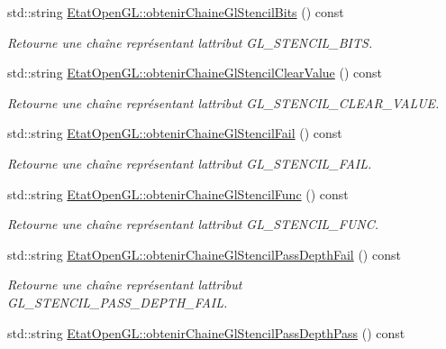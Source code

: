 \begin{DoxyCompactItemize}
std\+::string \hyperlink{group__utilitaire_ga9001f71cc6ac9cb771d5e9eeedd69c5a}{Etat\+Open\+G\+L\+::obtenir\+Chaine\+Gl\+Stencil\+Bits} () const 
\begin{DoxyCompactList}\small\item\em Retourne une chaîne représentant l\textquotesingle{}attribut G\+L\+\_\+\+S\+T\+E\+N\+C\+I\+L\+\_\+\+B\+I\+T\+S. \end{DoxyCompactList}\item 
std\+::string \hyperlink{group__utilitaire_ga0949a92c39c09a594a65cb035d992baf}{Etat\+Open\+G\+L\+::obtenir\+Chaine\+Gl\+Stencil\+Clear\+Value} () const 
\begin{DoxyCompactList}\small\item\em Retourne une chaîne représentant l\textquotesingle{}attribut G\+L\+\_\+\+S\+T\+E\+N\+C\+I\+L\+\_\+\+C\+L\+E\+A\+R\+\_\+\+V\+A\+L\+U\+E. \end{DoxyCompactList}\item 
std\+::string \hyperlink{group__utilitaire_ga3022225d3598456c739303b98e9d6ff8}{Etat\+Open\+G\+L\+::obtenir\+Chaine\+Gl\+Stencil\+Fail} () const 
\begin{DoxyCompactList}\small\item\em Retourne une chaîne représentant l\textquotesingle{}attribut G\+L\+\_\+\+S\+T\+E\+N\+C\+I\+L\+\_\+\+F\+A\+I\+L. \end{DoxyCompactList}\item 
std\+::string \hyperlink{group__utilitaire_ga1afa1d486d88c628562ec9e9ba6f6e10}{Etat\+Open\+G\+L\+::obtenir\+Chaine\+Gl\+Stencil\+Func} () const 
\begin{DoxyCompactList}\small\item\em Retourne une chaîne représentant l\textquotesingle{}attribut G\+L\+\_\+\+S\+T\+E\+N\+C\+I\+L\+\_\+\+F\+U\+N\+C. \end{DoxyCompactList}\item 
std\+::string \hyperlink{group__utilitaire_ga2e0217d78bce7c9e8aa865fa1b2d7e1f}{Etat\+Open\+G\+L\+::obtenir\+Chaine\+Gl\+Stencil\+Pass\+Depth\+Fail} () const 
\begin{DoxyCompactList}\small\item\em Retourne une chaîne représentant l\textquotesingle{}attribut G\+L\+\_\+\+S\+T\+E\+N\+C\+I\+L\+\_\+\+P\+A\+S\+S\+\_\+\+D\+E\+P\+T\+H\+\_\+\+F\+A\+I\+L. \end{DoxyCompactList}\item 
std\+::string \hyperlink{group__utilitaire_ga722cf069559981c09c4b40810b37986f}{Etat\+Open\+G\+L\+::obtenir\+Chaine\+Gl\+Stencil\+Pass\+Depth\+Pass} () const 

\end{DoxyCompactItemize}
